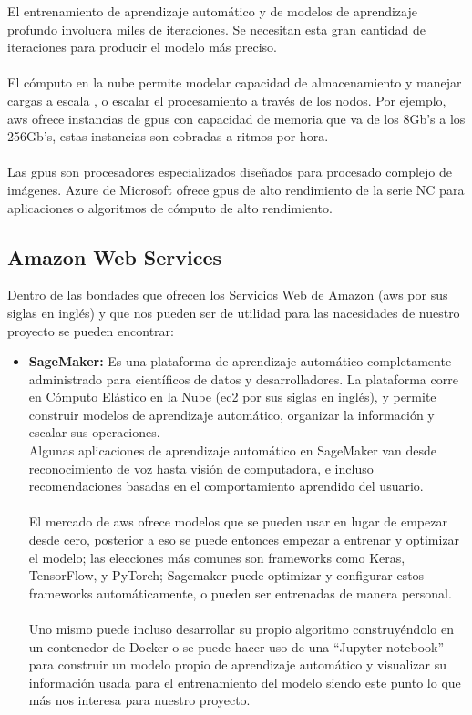 \documentclass[12pt, a4paper, titlepage]{report}
\begin{document}
		El entrenamiento de aprendizaje automático y de modelos de aprendizaje profundo involucra miles de iteraciones. Se necesitan esta gran cantidad de iteraciones para producir el modelo más preciso.\\\\ 
		El cómputo en la nube permite modelar capacidad de almacenamiento y manejar cargas a escala \cite{data_science_in_the_cloud}, o escalar el procesamiento a través de los nodos. Por ejemplo, \acrshort{aws} ofrece instancias de \acrshort{gpu}s con capacidad de memoria que va de los 8Gb's a los 256Gb's, estas instancias son cobradas a ritmos por hora.\\\\
		Las \acrshort{gpu}s son procesadores especializados diseñados para procesado complejo de imágenes. Azure de Microsoft ofrece \acrshort{gpu}s de alto rendimiento de la serie NC para aplicaciones o algoritmos de cómputo de alto rendimiento.
		
				\subsection{Amazon Web Services}
				Dentro de las bondades que ofrecen los Servicios Web de Amazon (\acrfull{aws} por sus siglas en inglés) y que nos pueden ser de utilidad para las nacesidades de nuestro proyecto se pueden encontrar: 
				
				\begin{itemize}
					\item \textbf{SageMaker:} Es una plataforma de aprendizaje automático completamente administrado para científicos de datos y desarrolladores. La plataforma corre en Cómputo Elástico en la Nube (\acrfull{ec2} por sus siglas en inglés), y permite construir modelos de aprendizaje automático, organizar la información y escalar sus operaciones. \\
					Algunas aplicaciones de aprendizaje automático en SageMaker van desde reconocimiento de voz hasta visión de computadora, e incluso recomendaciones basadas en el comportamiento aprendido del usuario.\\\\ 
					El mercado de \acrshort{aws} ofrece modelos que se pueden usar en lugar de empezar desde cero, posterior a eso se puede entonces empezar a entrenar y optimizar el modelo; las elecciones más comunes son frameworks como Keras, TensorFlow, y PyTorch; Sagemaker puede optimizar y configurar estos frameworks automáticamente, o pueden ser entrenadas de manera personal.\\\\ 
					\newpage
					Uno mismo puede incluso desarrollar su propio algoritmo construyéndolo en un contenedor de Docker o se puede hacer uso de una “Jupyter notebook” \cite{what_is_jupyter} para construir un modelo propio de aprendizaje automático y visualizar su información usada para el entrenamiento del modelo siendo este punto lo que más nos interesa para nuestro proyecto.
					
				\end{itemize}
		
\end{document}
